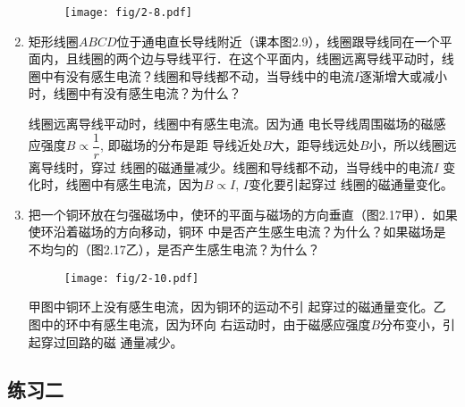 \begin{enumerate}
\begin{figure}[htp]
\centering
\texttt{[image: fig/2-8.pdf]}
\caption{}
\end{figure}


    \item 矩形线圈$ABCD$位于通电直长导线附近（课本图2.9），线圈跟导线同在一个平面内，且线圈的两个边与导线平行．在这个平面内，线圈远离导线平动时，线圈中有没有感生电流？线圈和导线都不动，当导线中的电流$I$逐渐增大或减小时，线圈中有没有感生电流？为什么？

    \begin{solution}
    线圈远离导线平动时，线圈中有感生电流。因为通
电长导线周围磁场的磁感应强度$B\propto \dfrac{1}{r}$, 
即磁场的分布是距
导线近处$B$大，距导线远处$B$小，所以线圈远离导线时，穿过
线圈的磁通量减少。线圈和导线都不动，当导线中的电流$I$
变化时，线圈中有感生电流，因为$B\propto I$, $I$变化要引起穿过
线圈的磁通量变化。
    \end{solution}
    
    \item 把一个铜环放在匀强磁场中，使环的平面与磁场的方向垂直（图2.17甲）．如果使环沿着磁场的方向移动，铜环
中是否产生感生电流？为什么？如果磁场是不均匀的（图2.17乙），是否产生感生电流？为什么？
\begin{figure}[htp]\centering
\texttt{[image: fig/2-10.pdf]}
\caption{}
\end{figure}

\begin{solution}
    甲图中铜环上没有感生电流，因为铜环的运动不引
    起穿过的磁通量变化。乙图中的环中有感生电流，因为环向
    右运动时，由于磁感应强度$B$分布变小，引起穿过回路的磁
    通量减少。
\end{solution}

\end{enumerate}




\subsection{练习二}

